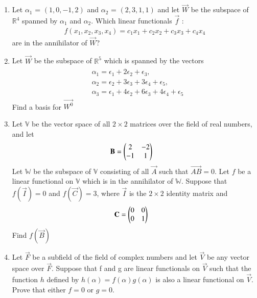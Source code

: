 \begin{enumerate}[label=\thesubsection.\arabic*.,ref=\thesubsection.\theenumi]
%
\\
\solution

\item Let $\alpha_1$ = $(1, 0,-1, 2)$ and $\alpha_2$ = $(2,3, 1,1)$ and let $\vec{W}$ be the subspace of $\mathbb{R}^4$ spanned by $\alpha_1$ and $\alpha_2$. Which linear functionals $\vec{f}$ :
\begin{align}
f(x_1,x_2,x_3,x_4) = c_1x_1 + c_2x_2 + c_3x_3 + c_4x_4 \label{eq:solutions/3/5/7/3} 
\end{align}
are in the annihilator of $\vec{W}$?
%
\\
\solution

\item Let $\vec{W}$ be the subspace of $\mathbb{R}^5$ which is spanned by the vectors  
   \begin{multline}
    \begin{aligned}
    &\alpha_1=\epsilon_1+2\epsilon_2+\epsilon_3,\\ &\alpha_2=\epsilon_2+3\epsilon_3+3\epsilon_4+\epsilon_5,\\&\alpha_3=\epsilon_1+4\epsilon_2+6\epsilon_3+4\epsilon_4+\epsilon_5
    \end{aligned}
    \end{multline}
    Find a basis for $\vec{W^0}$
%
\\
\solution

\item Let $\mathbb{V}$ be the vector space of all $2 \times 2$ matrices over the field of real numbers, and let
\begin{align}
\mathbf{B} &= \begin{pmatrix}2&-2\\-1&1\end{pmatrix}
\end{align}
Let $\mathbb{W}$ be the subspace of $\mathbb{V}$ consisting of all $\vec{A}$ such that $\vec{AB} = 0$. Let $f$ be a linear functional on $\mathbb{V}$ which is in the annihilator of $\mathbb{W}$. Suppose that $f(\vec{I}) = 0$ and $f(\vec{C}) = 3$, where $\vec{I}$ is the $2 \times 2$ identity matrix and
\begin{align}
\mathbf{C} &= \begin{pmatrix}0&0\\0&1\end{pmatrix}
\end{align}
Find $f(\vec{B})$
%
\\
\solution

\item Let $\vec{F}$ be a subfield of the field of complex numbers and let $\vec{V}$ be any vector space over $\vec{F}$. Suppose that f and g are linear functionals on $\vec{V}$ such that the function $h$ defined by $h(\alpha) =f(\alpha) g(\alpha)$ is also a linear functional on $\vec{V}$. Prove that either $f=0$ or $g=0$.

\end{enumerate}
